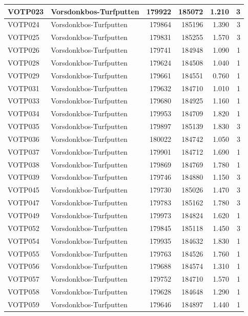 \documentclass[11pt,]{book}
\begin{document}
\begin{table}
\begin{tabular}[t]{l|l|r|r|r|r}
\hline
VOTP023 & Vorsdonkbos-Turfputten & 179922 & 185072 & 1.210 & 3\\
\hline
VOTP024 & Vorsdonkbos-Turfputten & 179864 & 185196 & 1.390 & 3\\
\hline
VOTP025 & Vorsdonkbos-Turfputten & 179831 & 185255 & 1.570 & 3\\
\hline
VOTP026 & Vorsdonkbos-Turfputten & 179741 & 184948 & 1.090 & 1\\
\hline
VOTP028 & Vorsdonkbos-Turfputten & 179624 & 184508 & 1.040 & 1\\
\hline
VOTP029 & Vorsdonkbos-Turfputten & 179661 & 184551 & 0.760 & 1\\
\hline
VOTP031 & Vorsdonkbos-Turfputten & 179632 & 184710 & 1.010 & 1\\
\hline
VOTP033 & Vorsdonkbos-Turfputten & 179680 & 184925 & 1.160 & 1\\
\hline
VOTP034 & Vorsdonkbos-Turfputten & 179953 & 184709 & 1.820 & 1\\
\hline
VOTP035 & Vorsdonkbos-Turfputten & 179897 & 185139 & 1.830 & 3\\
\hline
VOTP036 & Vorsdonkbos-Turfputten & 180022 & 184742 & 1.050 & 3\\
\hline
VOTP037 & Vorsdonkbos-Turfputten & 179901 & 184712 & 1.690 & 1\\
\hline
VOTP038 & Vorsdonkbos-Turfputten & 179869 & 184769 & 1.780 & 1\\
\hline
VOTP039 & Vorsdonkbos-Turfputten & 179746 & 184880 & 1.150 & 3\\
\hline
VOTP045 & Vorsdonkbos-Turfputten & 179730 & 185026 & 1.470 & 3\\
\hline
VOTP047 & Vorsdonkbos-Turfputten & 179783 & 185162 & 1.780 & 3\\
\hline
VOTP049 & Vorsdonkbos-Turfputten & 179973 & 184824 & 1.620 & 1\\
\hline
VOTP052 & Vorsdonkbos-Turfputten & 179845 & 185118 & 1.450 & 3\\
\hline
VOTP054 & Vorsdonkbos-Turfputten & 179935 & 184632 & 1.830 & 1\\
\hline
VOTP055 & Vorsdonkbos-Turfputten & 179763 & 184526 & 1.760 & 1\\
\hline
VOTP056 & Vorsdonkbos-Turfputten & 179688 & 184574 & 1.310 & 1\\
\hline
VOTP057 & Vorsdonkbos-Turfputten & 179752 & 184710 & 1.570 & 1\\
\hline
VOTP058 & Vorsdonkbos-Turfputten & 179628 & 184648 & 1.290 & 1\\
\hline
VOTP059 & Vorsdonkbos-Turfputten & 179646 & 184897 & 1.440 & 1\\

\end{tabular}
\end{table}
\end{document}
